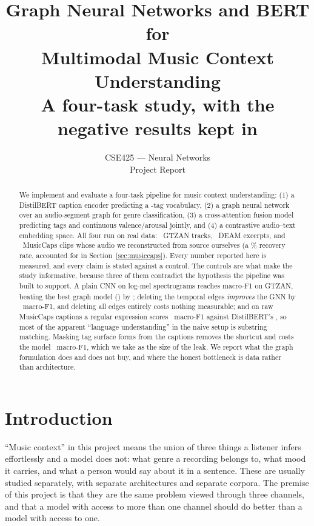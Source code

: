 \documentclass[10pt,a4paper]{article}
\title{\vspace{-1.2cm}\textbf{Graph Neural Networks and BERT for\\
Multimodal Music Context Understanding}\\[4pt]
\large A four-task study, with the negative results kept in}
\author{CSE425 --- Neural Networks \\ Project Report}
\date{}
\newcommand{\best}[1]{\textbf{#1}}
\begin{document}
\maketitle
\vspace{-0.8cm}

\begin{abstract}
\noindent
We implement and evaluate a four-task pipeline for music context understanding:
(1) a DistilBERT caption encoder predicting a \cfgNumTags-tag vocabulary,
(2) a graph neural network over an audio-segment graph for genre classification,
(3) a cross-attention fusion model predicting tags and continuous
valence/arousal jointly, and (4) a contrastive audio--text embedding space.
All four run on real data: \gtzanGraphs\ GTZAN tracks, \deamGraphs\ DEAM
excerpts, and \mcRecovered\ MusicCaps clips whose audio we reconstructed from
source ourselves (a \mcRecoveryPct\% recovery rate, accounted for in
Section~\ref{sec:musiccaps}). Every number reported here is measured, and every
claim is stated against a control.
The controls are what make the study informative, because three of them
contradict the hypothesis the pipeline was built to support. A plain CNN on
log-mel spectrograms reaches \best{\tTwoCnnMacroFOne} macro-F1 on GTZAN,
beating the best graph model (\tTwoBestGnnMacroFOne) by \tTwoCnnOverBestGnn;
deleting the temporal edges \emph{improves} the GNN by \tTwoSimOverFull\ macro-F1,
and deleting all edges entirely costs nothing measurable; and on raw MusicCaps captions a
regular expression scores \tOneLexRawMacroFOne\ macro-F1 against DistilBERT's
\tOneBertRawMacroFOne, so most of the apparent ``language understanding'' in the
naive setup is substring matching. Masking tag surface forms from the captions
removes the shortcut and costs the model \tOneShortcutGap\ macro-F1, which we
take as the size of the leak. We report what the graph formulation does and does
not buy, and where the honest bottleneck is data rather than architecture.
\end{abstract}

\section{Introduction}
``Music context'' in this project means the union of three things a listener
infers effortlessly and a model does not: what genre a recording belongs to, what
mood it carries, and what a person would say about it in a sentence. These are
usually studied separately, with separate architectures and separate corpora. The
premise of this project is that they are the same problem viewed through three
channels, and that a model with access to more than one channel should do better
than a model with access to one.
\end{document}
